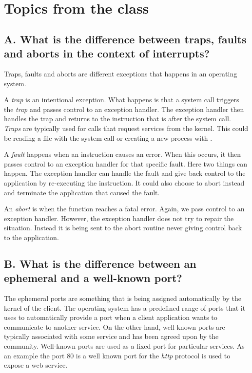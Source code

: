 \section{Topics from the class}

\subsection{A. What is the difference between traps, faults and aborts in the context of interrupts?}
Traps, faults and aborts are different exceptions that happens in an operating system.

A \textit{trap} is an intentional exception. What happens is that a system call triggers the \textit{trap} and passes control 
to an exception handler. The exception handler then handles the trap and returns to the instruction that is after the system call.
\textit{Traps} are typically used for calls that request services from the kernel. This could be reading a file with the system call 
or creating a new process with .

A \textit{fault} happens when an instruction causes an error. When this occurs, it then passes control to an exception handler for that specific fault.
Here two things can happen. The exception handler can handle the fault and give back control to the application by re-executing the instruction. 
It could also choose to abort instead and terminate the application that caused the fault.

An \textit{abort} is when the function reaches a fatal error. Again, we pass control to an exception handler.
However, the exception handler does not try to repair the situation. Instead it is being sent to the abort routine 
never giving control back to the application.

\subsection{B. What is the difference between an ephemeral and a well-known port?}
The ephemeral ports are something that is being assigned automatically by the kernel of the client. The operating system has a predefined range of ports that it uses to automatically provide a port when a client application wants to communicate to another service. 
On the other hand, well known ports are typically associated with some service and has been agreed upon by the community. Well-known ports are used as a fixed port for particular services. As an example the port 80 is a well known port for the \textit{http} protocol is used to expose a web service. 

